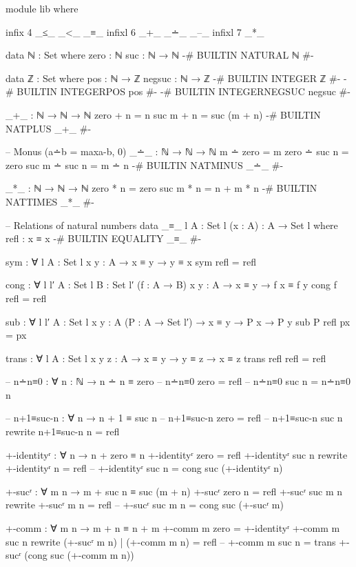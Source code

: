 \documentclass{article}
\begin{document}
\begin{prev}
\begin{code}
module lib where

infix 4 _≤_ _<_ _≡_
infixl 6 _+_ _∸_ _–_
infixl 7 _*_

data ℕ : Set where
    zero : ℕ
    suc : ℕ → ℕ
{-# BUILTIN NATURAL ℕ #-}

data ℤ : Set where
    pos : ℕ → ℤ
    negsuc : ℕ → ℤ
{-# BUILTIN INTEGER       ℤ    #-}
{-# BUILTIN INTEGERPOS    pos    #-}
{-# BUILTIN INTEGERNEGSUC negsuc #-}

_+_ : ℕ → ℕ → ℕ
zero + n = n
suc m + n = suc (m + n)
{-# BUILTIN NATPLUS _+_ #-}

-- Monus (a∸b = max{a-b, 0})
_∸_ : ℕ → ℕ → ℕ
m ∸ zero = m
zero ∸ suc n = zero
suc m ∸ suc n = m ∸ n
{-# BUILTIN NATMINUS _∸_ #-}

_*_ : ℕ → ℕ → ℕ
zero * n = zero
suc m * n = n + m * n
{-# BUILTIN NATTIMES _*_ #-}

-- Relations of natural numbers
data _≡_ {l} {A : Set l} (x : A) : A → Set l where
  refl : x ≡ x
{-# BUILTIN EQUALITY _≡_  #-}

sym : ∀ {l} {A : Set l} {x y : A} → x ≡ y → y ≡ x
sym refl = refl

cong : ∀ {l l′} {A : Set l} {B : Set l′} (f : A → B) {x y : A} → x ≡ y → f x ≡ f y
cong f refl = refl

sub : ∀ {l l′} {A : Set l} {x y : A} (P : A → Set l′) → x ≡ y → P x → P y
sub P refl px = px

trans : ∀ {l} {A : Set l} {x y z : A} → x ≡ y → y ≡ z → x ≡ z
trans refl refl = refl

-- n∸n≡0 : ∀ {n : ℕ} → n ∸ n ≡ zero
-- n∸n≡0 {zero} = refl
-- n∸n≡0 {suc n} = n∸n≡0 {n}

-- n+1≡suc-n : ∀ {n} → n + 1 ≡ suc n
-- n+1≡suc-n {zero} = refl
-- n+1≡suc-n {suc n} rewrite n+1≡suc-n {n} = refl

+-identityʳ : ∀ {n} → n + zero ≡ n
+-identityʳ {zero} = refl
+-identityʳ {suc n} rewrite +-identityʳ {n} = refl
-- +-identityʳ {suc n} = cong suc (+-identityʳ {n})

+-sucʳ : ∀ {m n} → m + suc n ≡ suc (m + n)
+-sucʳ {zero} {n} = refl
+-sucʳ {suc m} {n} rewrite +-sucʳ {m} {n} = refl
-- +-sucʳ {suc m} {n} = cong suc (+-sucʳ {m})

+-comm : ∀ {m n} → m + n ≡ n + m
+-comm {m} {zero} = +-identityʳ
+-comm {m} {suc n} 
    rewrite (+-sucʳ {m} {n}) | (+-comm {m} {n}) = refl
-- +-comm {m} {suc n} = trans +-sucʳ (cong suc (+-comm {m} {n}))


\end{code}
\end{prev}
\end{document}
